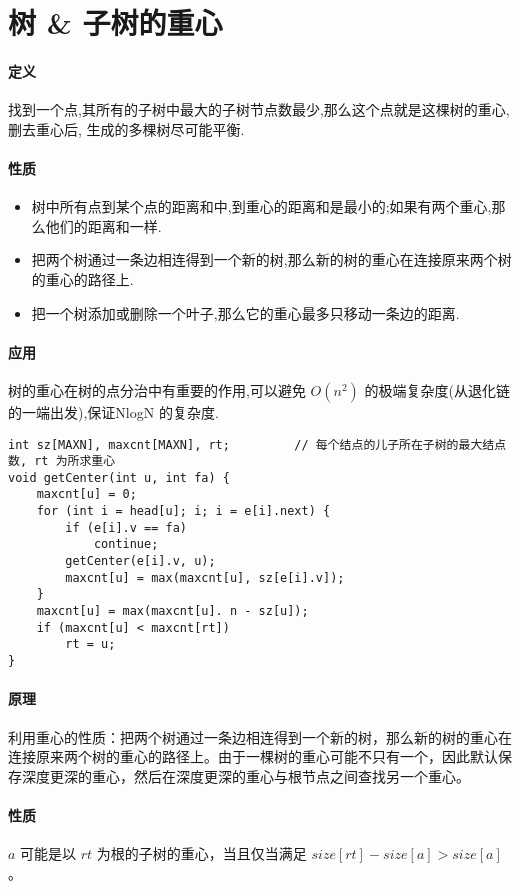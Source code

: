 \section{树 \& 子树的重心}
\paragraph{定义} 找到一个点,其所有的子树中最大的子树节点数最少,那么这个点就是这棵树的重心,删去重心后,
生成的多棵树尽可能平衡.
\paragraph{性质}
\begin{itemize}
\item 树中所有点到某个点的距离和中,到重心的距离和是最小的;如果有两个重心,那么他们的距离和一样.
\item 把两个树通过一条边相连得到一个新的树,那么新的树的重心在连接原来两个树的重心的路径上.
\item 把一个树添加或删除一个叶子,那么它的重心最多只移动一条边的距离.
\end{itemize}
\paragraph{应用} 树的重心在树的点分治中有重要的作用,可以避免 $O(n^2)$ 的极端复杂度(从退化链的一端出发),保证NlogN
的复杂度.

\begin{verbatim}
int sz[MAXN], maxcnt[MAXN], rt;         // 每个结点的儿子所在子树的最大结点数, rt 为所求重心
void getCenter(int u, int fa) {
    maxcnt[u] = 0;
    for (int i = head[u]; i; i = e[i].next) {
        if (e[i].v == fa)
            continue;
        getCenter(e[i].v, u);
        maxcnt[u] = max(maxcnt[u], sz[e[i].v]);
    }
    maxcnt[u] = max(maxcnt[u]. n - sz[u]);
    if (maxcnt[u] < maxcnt[rt])
        rt = u;
}    
\end{verbatim}

\paragraph{原理} 利用重心的性质：把两个树通过一条边相连得到一个新的树，那么新的树的重心在连接原来两个树的重心的路径上。由于一棵树的重心可能不只有一个，因此默认保存深度更深的重心，然后在深度更深的重心与根节点之间查找另一个重心。
\paragraph{性质} $a$ 可能是以 $rt$ 为根的子树的重心，当且仅当满足 $size[rt] - size[a] > size[a]$。

